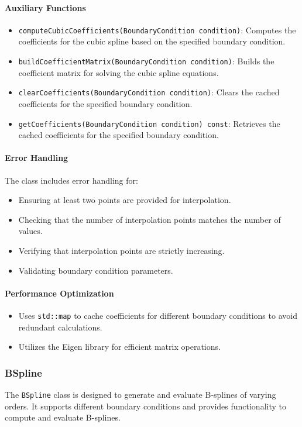 \documentclass[a4paper]{article}
\begin{document}
\begin{sloppypar}
\paragraph*{Auxiliary Functions}
\begin{itemize}
  \item \verb|computeCubicCoefficients(BoundaryCondition condition)|: Computes the coefficients for the cubic spline based on the specified boundary condition.
  \item \verb|buildCoefficientMatrix(BoundaryCondition condition)|: Builds the coefficient matrix for solving the cubic spline equations.
  \item \verb|clearCoefficients(BoundaryCondition condition)|: Clears the cached coefficients for the specified boundary condition.
  \item \verb|getCoefficients(BoundaryCondition condition) const|: Retrieves the cached coefficients for the specified boundary condition.
\end{itemize}

\paragraph*{Error Handling}
The class includes error handling for:
\begin{itemize}
  \item Ensuring at least two points are provided for interpolation.
  \item Checking that the number of interpolation points matches the number of values.
  \item Verifying that interpolation points are strictly increasing.
  \item Validating boundary condition parameters.
\end{itemize}

\paragraph*{Performance Optimization}
\begin{itemize}
  \item Uses \verb|std::map| to cache coefficients for different boundary conditions to avoid redundant calculations.
  \item Utilizes the Eigen library for efficient matrix operations.
\end{itemize}

\subsubsection{BSpline}
The \verb|BSpline| class is designed to generate and evaluate B-splines of varying orders. It supports different boundary conditions and provides functionality to compute and evaluate B-splines.


\end{sloppypar}
\end{document}

